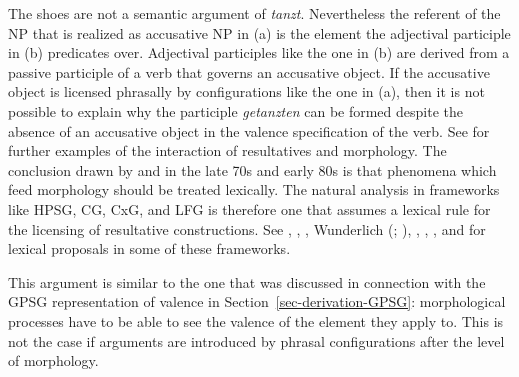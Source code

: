 \zl
The shoes are not a semantic argument of \emph{tanzt}. Nevertheless the referent of the NP that is realized as
accusative NP in (a) is the element the adjectival participle in (b) predicates
over. Adjectival participles like the one in (b) are derived from a passive participle of a
verb that governs an accusative object. If the accusative object is licensed phrasally by
configurations like the one in (a), then it is not possible to explain why the participle \emph{getanzten}
can be formed despite the absence of an accusative object in the valence specification of the verb. See  for
further examples of the interaction of resultatives and morphology.
The conclusion drawn by \citet[]{Dowty78a}
and \citet[]{Bresnan82a} in the late 70s and early 80s is that phenomena which feed morphology should be treated
lexically. The natural analysis in frameworks like HPSG, CG, CxG, and LFG is therefore one that assumes
a lexical rule for the licensing of resultative constructions. See
, , , Wunderlich (\citeyear[]{Wunderlich92a-u-kopiert}; \citeyear[--126]{Wunderlich97c}), ,
 , , and  for lexical proposals in some of
 these frameworks. 

This argument is similar to the one that was discussed in connection with the GPSG representation of
valence in Section~\ref{sec-derivation-GPSG}: morphological processes have to be able to see the valence of the element
they apply to. This is not the case if arguments are introduced by phrasal configurations after the
level of morphology.

